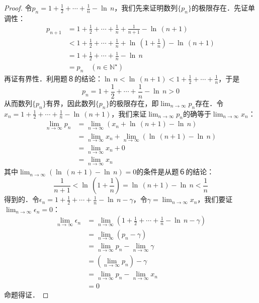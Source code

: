 \documentclass{ctexart}
\theoremstyle{definition}
\theoremstyle{definition}
\theoremstyle{plain}
\theoremstyle{plain}
\theoremstyle{plain}
\theoremstyle{definition}
\begin{document}
\begin{proof}
令$\displaystyle p_n = 1 + \frac{1}{2} + \cdots + \frac{1}{n} - \ln \, n$，我们先来证明数列$\{ p_n \}$的极限存在．先证单调性：
\begin{align}
    p_{n+1} &= 1 + \frac{1}{2} + \cdots + \frac{1}{n} + \frac{1}{n+1} - \ln \, \left( n + 1 \right) \\
    &< 1 + \frac{1}{2} + \cdots + \frac{1}{n} + \ln \, \left( 1 + \frac{1}{n} \right) - \ln \, \left(n+1\right) \\
    &= 1 + \frac{1}{2} + \cdots + \frac{1}{n} - \ln \, n \\
    &= p_n \quad (n \in \mathbb{N}^\star)
\end{align}
再证有界性．利用题８的结论：$\displaystyle \ln \, n < \ln \, \left( n+1 \right) < 1 + \frac{1}{2} + \cdots +\frac{1}{n}$，于是
\begin{equation}
    p_n = 1 + \frac{1}{2} +\cdots + \frac{1}{n} - \ln \, n > 0
\end{equation}
从而数列$\{ p_n \}$有界，因此数列$\{ p_n \}$的极限存在，即$ \displaystyle \lim_{n \to \infty} p_n$存在．令$\displaystyle x_n = 1 + \frac{1}{2} + \cdots + \frac{1}{n} - \ln \, \left( n + 1\right)$，我们来证$\displaystyle \lim_{n \to \infty} p_n$的确等于$\displaystyle \lim_{n \to \infty} x_n$：
\begin{align}
    \lim_{n \to \infty} p_n &= \lim_{n \to \infty} \left( x_n + \ln \, \left( n+1 \right) - \ln \, n \right) \\
    &= \lim_{n \to \infty} x_n + \lim_{n \to \infty} \left( \ln \, \left(n+1\right) - \ln \, n \right) \\
    &= \lim_{n \to \infty} x_n + 0 \\
    &= \lim_{n \to \infty} x_n
\end{align}
其中$\displaystyle \lim_{n \to \infty} \left( \ln \, \left(n+1\right) - \ln \, n\right) = 0$的条件是从题６的结论：
\begin{equation}
\frac{1}{n+1} < \ln \, \left(1 + \frac{1}{n}\right) = \ln \, \left(n+1\right) - \ln \, n < \frac{1}{n}
\end{equation}
得到的．令$\displaystyle \epsilon_n = 1 + \frac{1}{2} +\cdots + \frac{1}{n} - \ln \, n - \gamma$，令$\displaystyle \gamma = \lim_{n \to \infty} x_n$，我们要证$\displaystyle \lim_{n \to \infty} \epsilon_n = 0$：
\begin{align}
    \lim_{n \to \infty} \epsilon_n &= \lim_{n \to \infty} \left(1 + \frac{1}{2} + \cdots + \frac{1}{n} - \ln \, n - \gamma \right) \\
    &= \lim_{n \to \infty} \left( p_n - \gamma \right) \\
    &= \lim_{n\to \infty} p_n - \lim_{n\to \infty} \gamma \\
    &= \left( \lim_{n\to \infty} p_n \right) - \gamma \\
    &= \lim_{n\to \infty} p_n - \lim_{n \to \infty} x_n \\ 
    &= 0
\end{align}
命题得证．
\end{proof}
\end{document}
